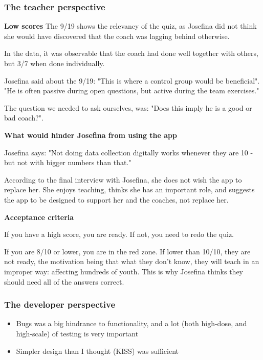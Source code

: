 \subsubsection{The teacher perspective}

  \textbf{Low scores}
  The 9/19 shows the relevancy of the quiz, as Josefina did not think she would have discovered that the coach was lagging behind otherwise.

  In the data, it was observable that the coach had done well together with others, but 3/7 when done individually.

  Josefina said about the 9/19: "This is where a control group would be beneficial". "He is often passive during open questions, but active during the team exercises."

  The question we needed to ask ourselves, was: "Does this imply he is a good or bad coach?".

  \textbf{What would hinder Josefina from using the app}

  Josefina says: "Not doing data collection digitally works whenever they are 10 - but not with bigger numbers than that."

  According to the final interview with Josefina, she does not wish the app to replace her. She enjoys teaching, thinks she has an important role, and suggests the app to be designed to support her and the coaches, not replace her.

  \textbf{Acceptance criteria}

  If you have a high score, you are ready. If not, you need to redo the quiz.

  If you are 8/10 or lower, you are in the red zone. If lower than 10/10, they are not ready, the motivation being that what they don't know, they will teach in an improper way: affecting hundreds of youth. This is why Josefina thinks they should need all of the answers correct.

\subsubsection{The developer perspective}

  \begin{itemize}
    \item Bugs was a big hindrance to functionality, and a lot (both high-dose, and high-scale) of testing is very important
    \item Simpler design than I thought (KISS) was sufficient
  \end{itemize}
